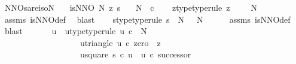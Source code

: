\begin{isabellebody}
\isamarkupfalse%
\ NNOs{\isacharunderscore}{\kern0pt}are{\isacharunderscore}{\kern0pt}iso{\isacharunderscore}{\kern0pt}N{\isacharcolon}{\kern0pt}\isanewline
\ \ \ {\isachardoublequoteopen}is{\isacharunderscore}{\kern0pt}NNO\ N\ z\ s{\isachardoublequoteclose}\isanewline
\ \ \ {\isachardoublequoteopen}N\ {\isasymcong}\ {\isasymnat}\isactrlsub c{\isachardoublequoteclose}\isanewline
%
\isadelimproof
%
\endisadelimproof
%
\isatagproof
{}\isamarkupfalse%
{\isacharminus}{\kern0pt}\isanewline
\ \ \isamarkupfalse%
\ z{\isacharunderscore}{\kern0pt}type{\isacharbrackleft}{\kern0pt}type{\isacharunderscore}{\kern0pt}rule{\isacharbrackright}{\kern0pt}{\isacharcolon}{\kern0pt}\ {\isachardoublequoteopen}{\isacharparenleft}{\kern0pt}z\ {\isacharcolon}{\kern0pt}\ {\isasymone}\ {\isasymrightarrow}\ \ N{\isacharparenright}{\kern0pt}{\isachardoublequoteclose}\ \isanewline
\ \ \ \ \isamarkupfalse%
\ assms\ is{\isacharunderscore}{\kern0pt}NNO{\isacharunderscore}{\kern0pt}def\ \isamarkupfalse%
\ blast\isanewline
\ \ \isamarkupfalse%
\ s{\isacharunderscore}{\kern0pt}type{\isacharbrackleft}{\kern0pt}type{\isacharunderscore}{\kern0pt}rule{\isacharbrackright}{\kern0pt}{\isacharcolon}{\kern0pt}\ {\isachardoublequoteopen}{\isacharparenleft}{\kern0pt}s\ {\isacharcolon}{\kern0pt}\ N\ {\isasymrightarrow}\ \ N{\isacharparenright}{\kern0pt}{\isachardoublequoteclose}\isanewline
\ \ \ \ \isamarkupfalse%
\ assms\ is{\isacharunderscore}{\kern0pt}NNO{\isacharunderscore}{\kern0pt}def\ \isamarkupfalse%
\ blast\ \isanewline
\ \ \isamarkupfalse%
\ \isamarkupfalse%
\ u\ \ u{\isacharunderscore}{\kern0pt}type{\isacharbrackleft}{\kern0pt}type{\isacharunderscore}{\kern0pt}rule{\isacharbrackright}{\kern0pt}{\isacharcolon}{\kern0pt}\ {\isachardoublequoteopen}u{\isacharcolon}{\kern0pt}\ {\isasymnat}\isactrlsub c\ {\isasymrightarrow}\ N{\isachardoublequoteclose}\ \isanewline
\ \ \ \ \ \ \ \ \ \ \ \ \ \ \ \ \ \ \ u{\isacharunderscore}{\kern0pt}triangle{\isacharcolon}{\kern0pt}\ {\isachardoublequoteopen}u\ {\isasymcirc}\isactrlsub c\ zero\ {\isacharequal}{\kern0pt}\ z{\isachardoublequoteclose}\ \isanewline
\ \ \ \ \ \ \ \ \ \ \ \ \ \ \ \ \ \ \ u{\isacharunderscore}{\kern0pt}square{\isacharcolon}{\kern0pt}\ {\isachardoublequoteopen}s\ {\isasymcirc}\isactrlsub c\ u\ {\isacharequal}{\kern0pt}\ u\ {\isasymcirc}\isactrlsub c\ successor{\isachardoublequoteclose}\isanewline

\end{isabellebody}
